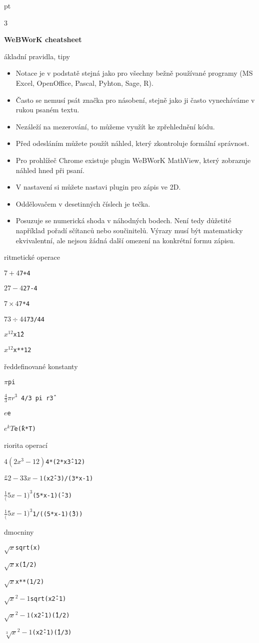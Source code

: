 \documentclass[10pt]{article}
\def\nadpis#1\par{\par\bigskip\noindent \textbf{#1} \par}
\def\polozka #1;#2;{\par $#1$\hfill \texttt{#2}\par\smallskip}
\begin{document}
 pt
\pagestyle{empty}

\setlength\columnsep{40pt}

\begin{multicols}3
  {\centering \textbf{WeBWorK cheatsheet}

    }

\bigskip
\nadpis Základní pravidla, tipy

\begin{itemize}
  \itemsep=0pt\raggedright
\item Notace je v podstatě stejná jako pro všechny bežně používané programy (MS Excel, OpenOffice, Pascal, Pyhton, Sage, R).
\item Často se nemusí psát značka pro násobení, stejně jako ji často vynecháváme v rukou psaném textu.
\item Nezáleží na mezerování, to můžeme využít ke zpřehlednění kódu.
\item Před odesláním můžete použít náhled, který zkontroluje formální správnost.
\item Pro prohlížeč Chrome existuje plugin WeBWorK MathView, který zobrazuje náhled hned při psaní.
\item V nastavení si můžete nastavi plugin pro zápis ve 2D.
\item Oddělovačem v desetinných číslech je tečka.
\item Posuzuje se numerická shoda v náhodných bodech. Není tedy důžetité například pořadí sčítanců nebo součinitelů. Výrazy musí být matematicky ekvivalentní, ale nejsou žádná další omezení na konkrétní formu zápisu.
\end{itemize}

\vfill \null
\columnbreak

\nadpis Aritmetické operace

\polozka 7+4;7+4;
\polozka 27-4;27-4;
\polozka 7\times 4;7*4;
\polozka 73\div 44;73/44;
\polozka x^{12};x\^{ }12;
\polozka x^{12};x**12;

\nadpis Předdefinované konstanty

\polozka \pi;pi;
\polozka \frac 43 \pi r^3;  4/3 pi r\^{ }3;
\polozka e;e;
\polozka e^{kT};e\^{ }(k*T);


\nadpis Priorita operací

\polozka 4(2x^3-12);4*(2*x\^{ }3-12);
\polozka \frac{x^2-3}{3x-1};(x\^{ }2-3)/(3*x-1);
\polozka \frac{1}{(5x-1)^3};(5*x-1)\^{ }(-3);
\polozka \frac{1}{(5x-1)^3};1/((5*x-1)\^{ }(3));

\nadpis Odmocniny

\polozka \sqrt{x};sqrt(x);
\polozka \sqrt{x};x\^{ }(1/2);
\polozka \sqrt{x};x**(1/2);
\polozka \sqrt{x^2-1};sqrt(x\^{ }2-1);
\polozka \sqrt{x^2-1};(x\^{ }2-1)\^{ }(1/2);
\polozka \sqrt[3]{x^2-1};(x\^{ }2-1)\^{ }(1/3);



\end{multicols}
\end{document}
